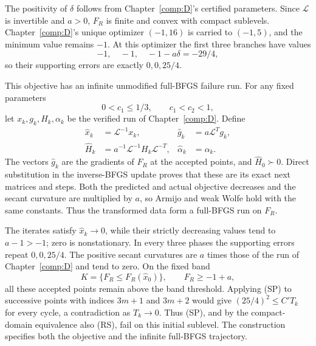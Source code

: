 The positivity of $\delta$ follows from Chapter~\ref{comp:D}'s certified parameters. Since $\mathcal L$ is invertible and $a>0$, $F_R$ is finite and convex with compact sublevels. Chapter~\ref{comp:D}'s unique optimizer $(-1,16)$ is carried to $(-1,5)$, and the minimum value remains $-1$. At this optimizer the first three branches have values
\[
 -1,\quad-1,\quad -1-a\delta=-29/4,
\]
so their supporting errors are exactly $0,0,25/4$.

This objective has an infinite unmodified full-BFGS failure run. For any fixed parameters
\[
 0<c_1\le1/3,\qquad c_1<c_2<1,
\]
let $x_k,g_k,H_k,\alpha_k$ be the verified run of Chapter~\ref{comp:D}. Define
\[
 \begin{aligned}
 \widehat x_k&=\mathcal L^{-1}x_k,&
 \widehat g_k&=a\mathcal L^Tg_k,\\
 \widehat H_k&=a^{-1}\mathcal L^{-1}H_k\mathcal L^{-T},&
 \widehat\alpha_k&=\alpha_k.
 \end{aligned}
\]
The vectors $\widehat g_k$ are the gradients of $F_R$ at the accepted points, and $\widehat H_0\succ0$. Direct substitution in the inverse-BFGS update proves that these are its exact next matrices and steps. Both the predicted and actual objective decreases and the secant curvature are multiplied by $a$, so Armijo and weak Wolfe hold with the same constants. Thus the transformed data form a full-BFGS run on $F_R$.

The iterates satisfy $\widehat x_k\to0$, while their strictly decreasing values tend to $a-1>-1$; zero is nonstationary. In every three phases the supporting errors repeat $0,0,25/4$. The positive secant curvatures are $a$ times those of the run of Chapter~\ref{comp:D} and tend to zero. On the fixed band
\[
 K=\{F_R\le F_R(\widehat x_0)\},\qquad
 F_R\ge -1+a,
\]
all these accepted points remain above the band threshold. Applying (SP) to successive points with indices $3m+1$ and $3m+2$ would give $(25/4)^2\le C'T_k$ for every cycle, a contradiction as $T_k\to0$. Thus (SP), and by the compact-domain equivalence also (RS), fail on this initial sublevel. The construction specifies both the objective and the infinite full-BFGS trajectory.


\setcounter{section}{4}
\setcounter{theorem}{0}
\setcounter{equation}{8}


